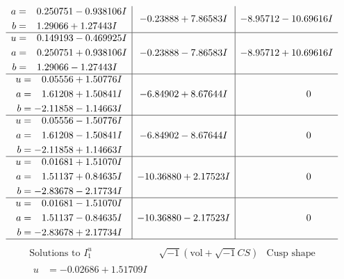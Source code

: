 \documentclass[1p]{elsarticle_modified}
\theoremstyle{definition}
\newcommand{\I}{\sqrt{-1}}
\begin{document}
$$\begin{array}{c|c|c}
\begin{aligned}
a &= \phantom{-}0.250751 - 0.938106 I \\
b &= \phantom{-}1.29066 + 1.27443 I\end{aligned}
 & -0.23888 + 7.86583 I & -8.95712 - 10.69616 I \\ \hline\begin{aligned}
u &= \phantom{-}0.149193 - 0.469925 I \\
a &= \phantom{-}0.250751 + 0.938106 I \\
b &= \phantom{-}1.29066 - 1.27443 I\end{aligned}
 & -0.23888 - 7.86583 I & -8.95712 + 10.69616 I \\ \hline\begin{aligned}
u &= \phantom{-}0.05556 + 1.50776 I \\
a &= \phantom{-}1.61208 + 1.50841 I \\
b &= -2.11858 - 1.14663 I\end{aligned}
 & -6.84902 + 8.67644 I & \phantom{-0.000000 } 0 \\ \hline\begin{aligned}
u &= \phantom{-}0.05556 - 1.50776 I \\
a &= \phantom{-}1.61208 - 1.50841 I \\
b &= -2.11858 + 1.14663 I\end{aligned}
 & -6.84902 - 8.67644 I & \phantom{-0.000000 } 0 \\ \hline\begin{aligned}
u &= \phantom{-}0.01681 + 1.51070 I \\
a &= \phantom{-}1.51137 + 0.84635 I \\
b &= -2.83678 - 2.17734 I\end{aligned}
 & -10.36880 + 2.17523 I & \phantom{-0.000000 } 0 \\ \hline\begin{aligned}
u &= \phantom{-}0.01681 - 1.51070 I \\
a &= \phantom{-}1.51137 - 0.84635 I \\
b &= -2.83678 + 2.17734 I\end{aligned}
 & -10.36880 - 2.17523 I & \phantom{-0.000000 } 0\\
 \hline 
 \end{array}$$\newpage$$\begin{array}{c|c|c}  
\text{Solutions to }I^u_{1}& \I (\text{vol} + \sqrt{-1}CS) & \text{Cusp shape}\\
 \hline 
\begin{aligned}
u &= -0.02686 + 1.51709 I \\

\end{aligned}
\end{array}$$
\end{document}
